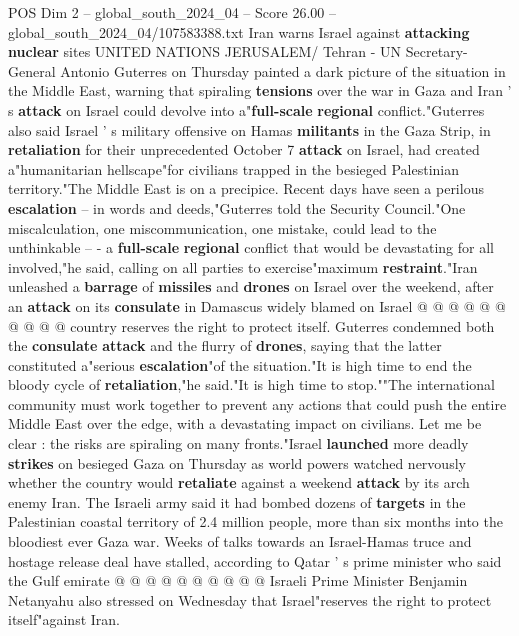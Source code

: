 \begin{textsample}{POS Dim 2 – global\_south\_2024\_04 – Score 26.00 – global\_south\_2024\_04/107583388.txt}  \label{ex:f2_pos_050}
Iran warns Israel against \textbf{attacking} \textbf{nuclear} sites UNITED NATIONS JERUSALEM/ Tehran - UN Secretary-General Antonio Guterres on Thursday painted a dark picture of the situation in the Middle East, warning that spiraling \textbf{tensions} over the war in Gaza and Iran ' s \textbf{attack} on Israel could devolve into a"\textbf{full-scale} \textbf{regional} conflict."Guterres also said Israel ' s military offensive on Hamas \textbf{militants} in the Gaza Strip, in \textbf{retaliation} for their unprecedented October 7 \textbf{attack} on Israel, had created a"humanitarian hellscape"for civilians trapped in the besieged Palestinian territory."The Middle East is on a precipice.
Recent days have seen a perilous \textbf{escalation} -- in words and deeds,"Guterres told the Security Council."One miscalculation, one miscommunication, one mistake, could lead to the unthinkable -- - a \textbf{full-scale} \textbf{regional} conflict that would be devastating for all involved,"he said, calling on all parties to exercise"maximum \textbf{restraint}."Iran unleashed a \textbf{barrage} of \textbf{missiles} and \textbf{drones} on Israel over the weekend, after an \textbf{attack} on its \textbf{consulate} in Damascus widely blamed on Israel @ @ @ @ @ @ @ @ @ @ country reserves the right to protect itself.
Guterres condemned both the \textbf{consulate} \textbf{attack} and the flurry of \textbf{drones}, saying that the latter constituted a"serious \textbf{escalation}"of the situation."It is high time to end the bloody cycle of \textbf{retaliation},"he said."It is high time to stop.""The international community must work together to prevent any actions that could push the entire Middle East over the edge, with a devastating impact on civilians.
Let me be clear : the risks are spiraling on many fronts."Israel \textbf{launched} more deadly \textbf{strikes} on besieged Gaza on Thursday as world powers watched nervously whether the country would \textbf{retaliate} against a weekend \textbf{attack} by its arch enemy Iran.
The Israeli army said it had bombed dozens of \textbf{targets} in the Palestinian coastal territory of 2.4 million people, more than six months into the bloodiest ever Gaza war.
Weeks of talks towards an Israel-Hamas truce and hostage release deal have stalled, according to Qatar ' s prime minister who said the Gulf emirate @ @ @ @ @ @ @ @ @ @ Israeli Prime Minister Benjamin Netanyahu also stressed on Wednesday that Israel"reserves the right to protect itself"against Iran.

\end{textsample}
